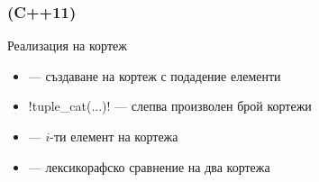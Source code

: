 \documentclass{beamer}
\begin{document}
\begin{frame}
  \frametitle{ (C++11)}

  Реализация на кортеж
  \begin{itemize}
  \item {} --- създаване на кортеж с подадение елементи
  \item \lst!tuple_cat(...)! --- слепва произволен брой кортежи
  \item {} --- $i$-ти елемент на кортежа
  \item \lst {==,!=,<,>,<=,>=} --- лексикорафско сравнение на два кортежа
  \end{itemize}
\end{frame}
\end{document}
